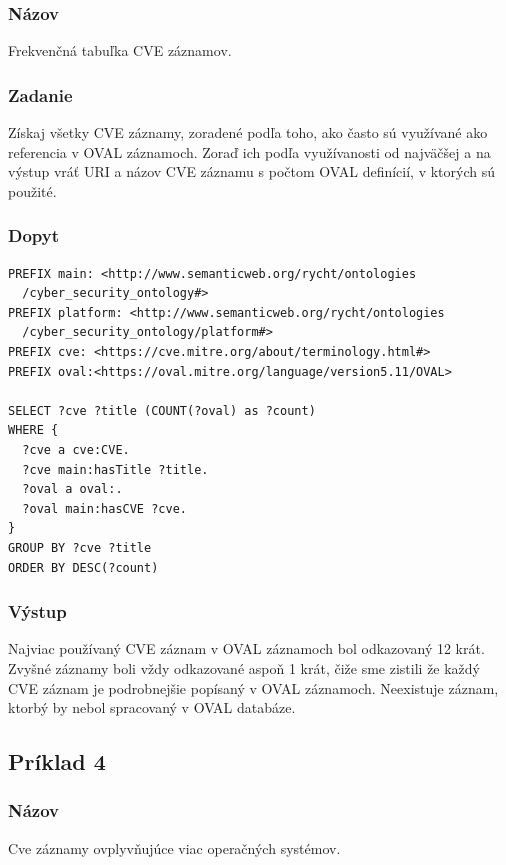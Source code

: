 \documentclass[12pt, a4paper, oneside]{book}
\begin{document}
\subsubsection*{Názov}
Frekvenčná tabuľka CVE záznamov.

\subsubsection*{Zadanie}
Získaj všetky CVE záznamy, zoradené podľa toho, ako často sú využívané ako referencia v OVAL záznamoch. Zoraď ich podľa využívanosti od najväčšej a na výstup vráť URI a názov CVE záznamu s počtom OVAL definícií, v ktorých sú použité.

\subsubsection*{Dopyt}
\begin{small}
\begin{verbatim}
PREFIX main: <http://www.semanticweb.org/rycht/ontologies
  /cyber_security_ontology#>
PREFIX platform: <http://www.semanticweb.org/rycht/ontologies
  /cyber_security_ontology/platform#>
PREFIX cve: <https://cve.mitre.org/about/terminology.html#>
PREFIX oval:<https://oval.mitre.org/language/version5.11/OVAL>

SELECT ?cve ?title (COUNT(?oval) as ?count)
WHERE {
  ?cve a cve:CVE.
  ?cve main:hasTitle ?title.
  ?oval a oval:.
  ?oval main:hasCVE ?cve.
} 
GROUP BY ?cve ?title
ORDER BY DESC(?count)
\end{verbatim}
\end{small}


\subsubsection*{Výstup}
Najviac používaný CVE záznam v OVAL záznamoch bol odkazovaný 12 krát. Zvyšné záznamy boli vždy odkazované aspoň 1 krát, čiže sme zistili že každý CVE záznam je podrobnejšie popísaný v OVAL záznamoch. Neexistuje záznam, ktorbý by nebol spracovaný v OVAL databáze.


\subsection*{Príklad 4}
\label{sec:priklad4}
\subsubsection*{Názov}
Cve záznamy ovplyvňujúce viac operačných systémov.
\end{document}
